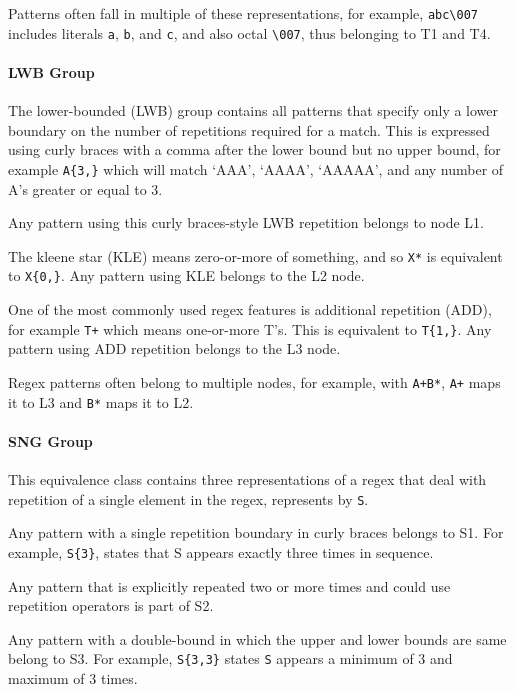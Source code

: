 Patterns often fall in multiple of these representations, for example, \verb!abc\007! includes literals \verb!a!, \verb!b!, and \verb!c!, and also octal \verb!\007!, thus belonging to T1 and T4. 


\paragraph{LWB Group}
The lower-bounded (LWB) group contains all patterns that specify only a lower boundary on the number of repetitions required for a match.  This is expressed using curly braces with a comma after the lower bound but no upper bound, for example \verb!A{3,}! which will match `AAA', `AAAA', `AAAAA', and any number of A's greater or equal to 3.  


\begin{description}  \itemsep -1pt
\item[L1:] Any pattern using this curly braces-style LWB repetition belongs to node L1.
\item[L2:] The kleene star (KLE) means zero-or-more of something, and so \verb!X*! is equivalent to \verb!X{0,}!.  Any pattern using KLE belongs to the L2 node.
\item[L3:] One of the most commonly used regex features is additional repetition (ADD), for example \verb!T+! which means one-or-more T's.  This is equivalent to \verb!T{1,}!.  Any pattern using ADD repetition belongs to the L3 node.
\end{description}

Regex patterns often belong to multiple nodes, for example, with \verb!A+B*!,  \verb!A+! maps it to L3 and \verb!B*! maps it to L2. 

\paragraph{SNG Group} This equivalence class contains  three representations of a regex that  deal with repetition of a single element in the regex, represents by \verb!S!.

\begin{description}  \itemsep -1pt
\item[S1:] Any pattern with a single repetition boundary in curly braces belongs to S1. For example,   \verb!S{3}!, states that S appears exactly three times in sequence. 
\item[S2:] Any pattern that is explicitly repeated two or more times and could use repetition operators is part of S2. 
\item[S3:] Any pattern with a double-bound in which the upper and lower bounds are same belong to S3. For example, \verb!S{3,3}! states \verb!S! appears a minimum of 3 and maximum of 3 times. 
\end{description}

